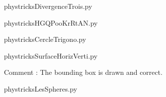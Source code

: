 
    \newcommand{\CaptionFigDivergenceTrois}{<+Type your caption here+>}
    \begin{center}
        
    \end{center}
    phystricksDivergenceTrois.py

    

    \clearpage
    


    \newcommand{\CaptionFigHGQPooKrRtAN}{<+Type your caption here+>}
    \begin{center}
        
    \end{center}
    phystricksHGQPooKrRtAN.py

    

    \clearpage
    


    \newcommand{\CaptionFigCercleTrigono}{<+Type your caption here+>}
    \begin{center}
        
    \end{center}
    phystricksCercleTrigono.py

    

    \clearpage
    


    \newcommand{\CaptionFigSurfaceHorizVerti}{<+Type your caption here+>}
    \begin{center}
        
    \end{center}
    phystricksSurfaceHorizVerti.py

    Comment : The bounding box is drawn and correct.

    \clearpage
    


    \newcommand{\CaptionFigLesSpheres}{<+Type your caption here+>}
    \begin{center}
        
    \end{center}
    phystricksLesSpheres.py

    

    \clearpage
    


